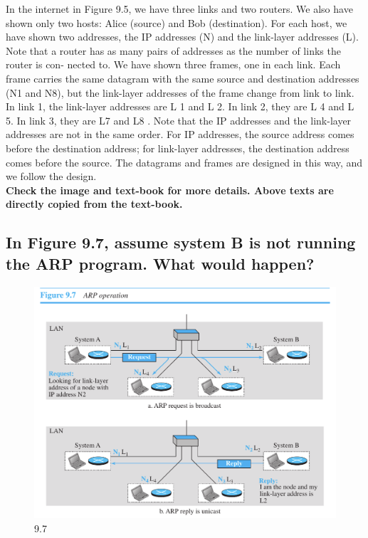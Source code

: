 \documentclass{article}
\begin{document}
In the internet in Figure 9.5, we have three links and two routers. We also have
shown only two hosts: Alice (source) and Bob (destination). For each host, we have
shown two addresses, the IP addresses (N) and the link-layer addresses (L). Note
that a router has as many pairs of addresses as the number of links the router is con-
nected to. We have shown three frames, one in each link. Each frame carries the
same datagram with the same source and destination addresses (N1 and N8), but the
link-layer addresses of the frame change from link to link. In link 1, the link-layer
addresses are L 1 and L 2. In link 2, they are L 4 and L 5. In link 3, they are L7 and L8 .
Note that the IP addresses and the link-layer addresses are not in the same order. For
IP addresses, the source address comes before the destination address; for link-layer
addresses, the destination address comes before the source. The datagrams and frames are designed in this way, and we follow the design. \\

\textbf{Check the image and text-book for more details. Above texts are directly copied from the text-book.}

\subsection{
	In Figure 9.7, assume system B is not running the ARP program. What would
	happen?
}
\begin{figure}[H]
	\center
	\includegraphics[scale=0.5]{9.7.png}
	\caption{9.7}
	\label{fig:9.7}
\end{figure}
\end{document}
